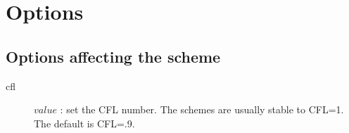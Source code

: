 \documentclass[10pt]{article}
\begin{document}

% 




\section{Options} \label{sec:option}

\subsection{Options affecting the scheme}

\begin{description}
  \item [\qquad cfl] $value$ : set the CFL number. The schemes are usually stable to CFL=1. The default is CFL=.9.
\end{description}
\end{document}
